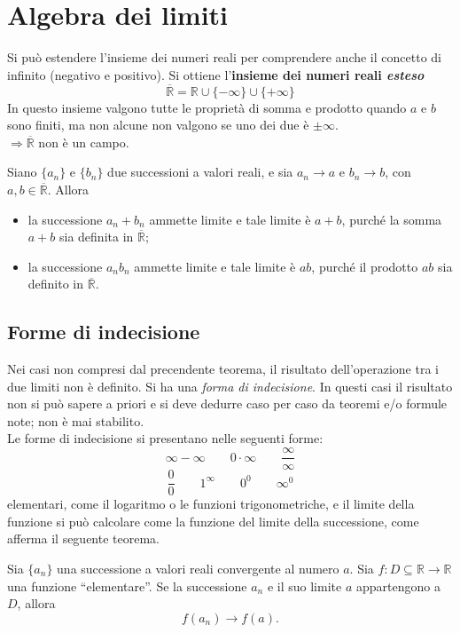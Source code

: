 \documentclass[a4paper,12pt, oneside]{book}
\begin{document}
\section{Algebra dei limiti}
\begin{shaded} Si può estendere l'insieme dei numeri reali per comprendere anche
  il concetto di infinito (negativo e positivo). Si ottiene l'\textbf{insieme dei
    numeri reali
    \emph{esteso}} $$\overline{\mathbb{R}}=\mathbb{R}\cup\{-\infty\}\cup\{+\infty\}$$In
  questo insieme valgono tutte le proprietà di somma e prodotto quando $a$ e $b$
  sono finiti, ma non alcune non valgono se uno dei due è
  $\pm\infty$.\\$\Rightarrow\overline{\mathbb{R}}$ non è un campo.
\end{shaded}
\begin{teorema} Siano $\{a_n\}$ e $\{b_n\}$ due successioni a valori reali, e
  sia $a_n\to a$ e $b_n\to b$, con $a,b\in\overline{\mathbb{R}}$. Allora
  \begin{itemize}
    \item la successione $a_n+b_n$ ammette limite e tale limite è $a+b$, purché
    la somma $a+b$ sia definita in $\overline{\mathbb{R}}$;
    \item la successione $a_nb_n$ ammette limite e tale limite è $ab$, purché il
    prodotto $ab$ sia definito in $\overline{\mathbb{R}}$.
  \end{itemize}
\end{teorema}
\subsection{Forme di indecisione} Nei casi non compresi dal precendente teorema,
il risultato dell'operazione tra i due limiti non è definito. Si ha una
\textit{forma di indecisione}. In questi casi il risultato non si può sapere a
priori e si deve dedurre caso per caso da teoremi e/o formule note; non è mai
stabilito.\\ Le forme di indecisione si presentano nelle seguenti forme:
$$\infty-\infty\qquad 0\cdot\infty\qquad\frac{\infty}{\infty}$$
$$\frac00\qquad 1^\infty\qquad 0^0\qquad \infty^0$$
elementari, come il logaritmo o le funzioni trigonometriche, e il limite della
funzione si può calcolare come la funzione del limite della successione, come
afferma il seguente teorema.
\begin{teorema} Sia $\{a_n\}$ una successione a valori reali convergente al
  numero $a$. Sia $f\colon D\subseteq\mathbb{R}\to\mathbb{R}$ una funzione
  ``elementare''. Se la successione $a_n$ e il suo limite $a$ appartengono a $D$,
  allora
  \[ f(a_n)\to f(a).
  \]
\end{teorema} %
\end{document}
